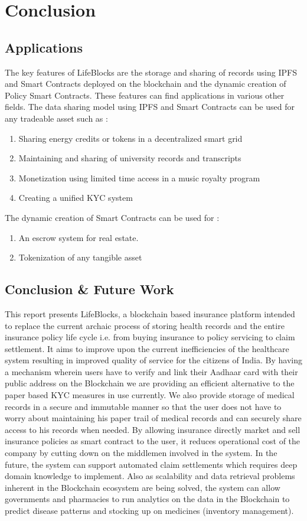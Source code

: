 \chapter{Conclusion}
\section{ Applications}

The key features of LifeBlocks are the storage and sharing of records using IPFS and Smart Contracts deployed on the blockchain and the dynamic creation of Policy Smart Contracts. These features can find applications in various other fields.
The data sharing model using IPFS and Smart Contracts can be used for any tradeable asset such as :
\begin{enumerate}
\item Sharing energy credits or tokens in a decentralized smart grid
\item Maintaining and sharing of university records and transcripts
\item Monetization using limited time access in a music royalty program
\item Creating a unified KYC system
\end{enumerate}
The dynamic creation of Smart Contracts can be used for :
\begin{enumerate}
\item An escrow system for real estate.
\item Tokenization of any tangible asset
\end{enumerate}
\clearpage
\section{Conclusion \& Future Work}

This report presents LifeBlocks, a blockchain based insurance platform intended to replace the current archaic process of storing health records and the entire insurance policy life cycle i.e. from buying insurance to policy servicing to claim settlement. It aims to improve upon the current inefficiencies of the healthcare system resulting in improved quality of service for the citizens of India. By having a mechanism wherein users have to verify and link their Aadhaar card with their public address on the Blockchain we are providing an efficient alternative to the paper based KYC measures in use currently. We also provide storage of medical records in a secure and immutable manner so that the user does not have to worry about maintaining his paper trail of medical records and can securely share access to his records when needed. By allowing insurance directly market and sell insurance policies as smart contract to the user, it reduces operational cost of the company by cutting down on the middlemen involved in the system. In the future, the system can support automated claim settlements which requires deep domain knowledge to implement. Also as scalability and data retrieval problems inherent in the Blockchain ecosystem are being solved, the system can allow governments and pharmacies to run analytics on the data in the Blockchain to predict disease patterns and stocking up on medicines (inventory management).   


